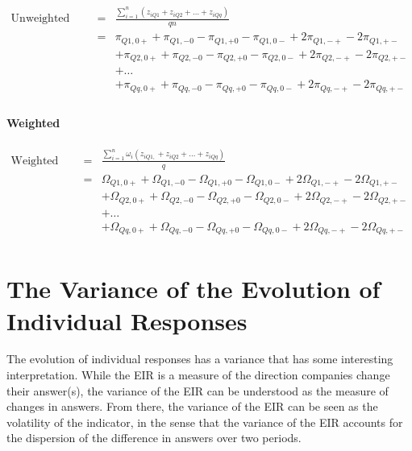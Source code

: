 \documentclass[12pt,a4paper,oneside]{book}
\begin{document}
\begin{eqnarray}
\mbox{Unweighted EIR}\ &=& \frac{\sum_{i=1}^n \left(z_{i Q1} + z_{i Q2} + \ldots + z_{i Qq} \right)}{qn} \nonumber \\
&=&    \pi_{Q1,0+} + \pi_{Q1,-0} - \pi_{Q1,+0} - \pi_{Q1,0-} +2 \pi_{Q1,-+} -2\pi_{Q1,+-} \nonumber \\
&&    + \pi_{Q2,0+} + \pi_{Q2,-0} - \pi_{Q2,+0} - \pi_{Q2,0-} +2 \pi_{Q2,-+} -2\pi_{Q2,+-} \nonumber \\
&&	 + \ldots \nonumber \\
&&   + \pi_{Qq,0+} + \pi_{Qq,-0} - \pi_{Qq,+0} - \pi_{Qq,0-} +2 \pi_{Qq,-+} -2\pi_{Qq,+-} \nonumber \\
\end{eqnarray}



\subsubsection{Weighted}


\begin{eqnarray}
    \mbox{Weighted EIR}\ &=& \frac{ \sum_{i=1}^n \omega_i \left(z_{i Q1,} + z_{i Q2} + \ldots + z_{i Qq} \right)}{q} \nonumber \\
&=&    \Omega_{Q1,0+} + \Omega_{Q1,-0} - \Omega_{Q1,+0} - \Omega_{Q1,0-} +2 \Omega_{Q1,-+} -2\Omega_{Q1,+-} \nonumber \\
&&    + \Omega_{Q2,0+} + \Omega_{Q2,-0} - \Omega_{Q2,+0} - \Omega_{Q2,0-} +2 \Omega_{Q2,-+} -2\Omega_{Q2,+-} \nonumber \\
&&	 + \ldots \nonumber \\
&&   + \Omega_{Qq,0+} + \Omega_{Qq,-0} - \Omega_{Qq,+0} - \Omega_{Qq,0-} +2 \Omega_{Qq,-+} -2\Omega_{Qq,+-} \nonumber \\
\end{eqnarray}




\chapter{The Variance of the Evolution of Individual Responses} \label{Chapter:Var Z}

The evolution of individual responses has a variance that has some  interesting interpretation.
While the EIR is a measure of the direction companies change their answer(s), the variance of the EIR can be understood as the measure of changes in answers.
From there, the variance of the EIR can be seen as the volatility of the indicator, in the sense that the variance of the EIR accounts for the dispersion of the difference in answers over two periods.
\end{document}
